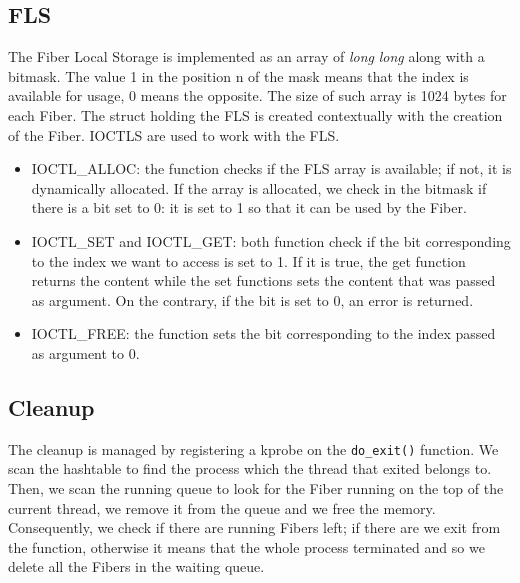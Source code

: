 \documentclass[11pt]{article}
\begin{document}
\subsection{FLS}
The Fiber Local Storage is implemented as an array of \textit{long} \textit{long} along with a bitmask. The value 1 in the position n of the mask means that the index is available for usage, 0 means the opposite. The size of such array is 1024 bytes for each Fiber. The struct holding the FLS is created contextually with the creation of the Fiber. IOCTLS are used to work with the FLS.
\begin{itemize}
\item IOCTL\_ALLOC: the function checks if the FLS array is available; if not, it is dynamically allocated. If the array is allocated, we check in the bitmask if there is a bit set to 0: it is set to 1 so that it can be used by the Fiber.
\item IOCTL\_SET and IOCTL\_GET: both function check if the bit corresponding to the index we want to access is set to 1. If it is true, the get function returns the content while the set functions sets the content that was passed as argument. On the contrary, if the bit is set to 0, an error is returned.
\item IOCTL\_FREE: the function sets the bit corresponding to the index passed as argument to 0.
\end{itemize}

\subsection{Cleanup}
The cleanup is managed by registering a kprobe on the \texttt{do\_exit()} function. We scan the hashtable to find the process which the thread that exited belongs to. Then, we scan the running queue to look for the Fiber running on the top of the current thread, we remove it from the queue and we free the memory. Consequently, we check if there are running Fibers left; if there are we exit from the function, otherwise it means that the whole process terminated and so we delete all the Fibers in the waiting queue.
\end{document}
